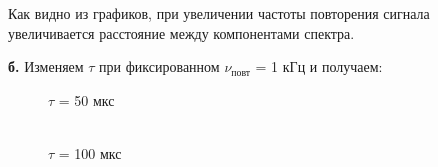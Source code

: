 \documentclass[a4paper,12pt]{article}
\begin{document}
\begin{enumerate}
Как видно из графиков, при увеличении частоты повторения сигнала увеличивается расстояние между компонентами спектра.

\newpage


\textbf{б.} Изменяем $\tau$ при фиксированном $\nu_\text{повт}$ = 1 кГц и получаем:

\begin{figure}[h]
\begin{minipage}[h]{0.47\linewidth}
 $\tau$ = 50 мкс \\
\end{minipage}
\hfill
\begin{minipage}[h]{0.47\linewidth}
 \\ $\tau$ = 100 мкс

\end{minipage}
\end{figure}
\end{enumerate}
\end{document}
